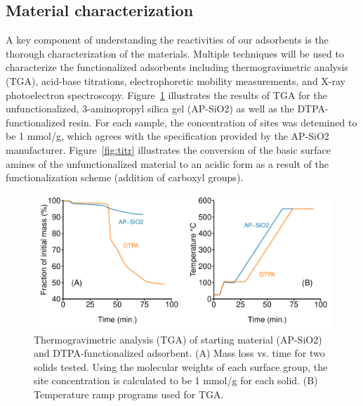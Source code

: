 \subsection{Material characterization}

A key component of understanding the reactivities of our adsorbents is the thorough characterization of the materials.
Multiple techniques will be used to characterize the functionalized adsorbents including thermogravimetric analysis (TGA), acid-base titrations, electrophoretic mobility measurements, and X-ray photoelectron spectroscopy.
Figure~\ref{fig:TGA-comb} illustrates the results of TGA for the unfunctionalized, 3-aminopropyl silica gel (AP-SiO2) as well as the DTPA-functionalized resin.
For each sample, the concentration of sites was detemined to be 1 mmol/g, which agrees with the specification provided by the AP-SiO2 manufacturer.
Figure~\ref{fig:titr} illustrates the conversion of the basic surface amines of the unfunctionalized material to an acidic form as a result of the functionalization scheme (addition of carboxyl groups).

\begin{figure}[htbp]
\begin{center}
\includegraphics[width = \textwidth]{proposal_figures/DTPA-raw-TGA-combined.pdf}
\caption{Thermogravimetric analysis (TGA) of starting material (AP-SiO2) and DTPA-functionalized adsorbent. (A) Mass loss vs. time for two solids tested. Using the molecular weights of each surface group, the site concentration is calculated to be 1 mmol/g for each solid. (B) Temperature ramp programs used for TGA.}\label{fig:TGA-comb}
\end{center}
\end{figure}

